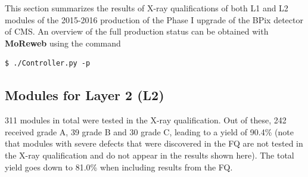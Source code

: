 \documentclass[a4paper,12pt,twoside]{article}
\begin{document}
This section summarizes the results of X-ray qualifications of both L1 and L2 modules of the 2015-2016 production of the Phase I upgrade of the BPix detector of CMS. An overview of the full production status can be obtained with \textbf{MoReweb} using the command 
\begin{verbatim}
$ ./Controller.py -p
\end{verbatim}

\subsection{Modules for Layer 2 (L2)}
311 modules in total were tested in the X-ray qualification. Out of these, 242 received grade A, 39 grade B and 30 grade C, leading to a yield of 90.4\% (note that modules with severe defects that were discovered in the FQ are not tested in the X-ray qualification and do not appear in the results shown here). The total yield goes down to 81.0\% when including results from the FQ.  
\end{document}
